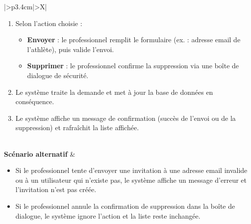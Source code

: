 ﻿\documentclass[a4paper,12pt]{report}
\begin{document}
\begin{table}[H]
\begin{tabularx}{\textwidth}{|>{\RaggedRight\arraybackslash}p{3.4cm}|>{\RaggedRight\arraybackslash}X|}
\begin{minipage}[t]{\linewidth}
\begin{enumerate}[label=\arabic*., leftmargin=*, topsep=0pt, itemsep=1pt]
    \begin{itemize}[leftmargin=*, topsep=1pt, itemsep=1pt]
        \item \textbf{Ajouter un nouvel athlète} : cliquer sur le bouton permettant d'inviter un client. 
        \item \textbf{Annuler une demande} : sélectionner une invitation en attente (ou un lien existant) et cliquer sur l'icône de suppression. 
    \end{itemize}
    \item Selon l'action choisie :
    \begin{itemize}[leftmargin=*, topsep=1pt, itemsep=1pt]
        \item \textbf{Envoyer} : le professionnel remplit le formulaire (ex. : adresse email de l'athlète), puis valide l'envoi.
        \item \textbf{Supprimer} : le professionnel confirme la suppression via une boîte de dialogue de sécurité.
    \end{itemize}
    \item Le système traite la demande et met à jour la base de données en conséquence.
    \item Le système affiche un message de confirmation (succès de l'envoi ou de la suppression) et rafraîchit la liste affichée.
\end{enumerate}
\vspace{2pt}
\end{minipage} \\
\hline
\textbf{Scénario alternatif} &
\begin{minipage}[t]{\linewidth}\sloppy
\vspace{2pt}
\begin{itemize}[leftmargin=*, topsep=0pt, itemsep=1pt]
    \item  Si le professionnel tente d'envoyer une invitation à une adresse email invalide ou à un utilisateur qui n'existe pas, le système affiche un message d'erreur et l'invitation n'est pas créée.
    \item  Si le professionnel annule la confirmation de suppression dans la boîte de dialogue, le système ignore l'action et la liste reste inchangée.
\end{itemize}
\vspace{2pt}
\end{minipage} \\
\hline
\end{tabularx}
\fussy

\end{table}
\endgroup
\end{document}
